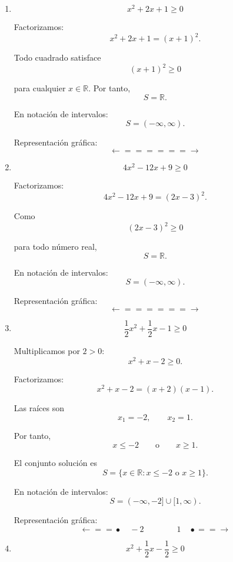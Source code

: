 \documentclass[12pt]{article}
\theoremstyle{plain}
\theoremstyle{definition}
\theoremstyle{remark}
\begin{document}
{\begin{enumerate}
Representación gráfica:
\[
\longleftarrow\!\!=\!\!=\!\bullet
\quad1
\qquad\qquad
3\quad
\bullet\!\!=\!\!=\!\longrightarrow
\]

\item
\[
x^2+2x+1\geq0
\]

Factorizamos:
\[
x^2+2x+1=(x+1)^2.
\]

Todo cuadrado satisface
\[
(x+1)^2\geq0
\]

para cualquier \(x\in\mathbb{R}\). Por tanto,
\[
\boxed{
S=\mathbb{R}.
}
\]

En notación de intervalos:
\[
\boxed{
S=(-\infty,\infty).
}
\]

Representación gráfica:
\[
\longleftarrow\!\!=\!\!=\!\!=\!\!=\!\!=\!\!=\!\longrightarrow
\]

\item
\[
4x^2-12x+9\geq0
\]

Factorizamos:
\[
4x^2-12x+9=(2x-3)^2.
\]

Como
\[
(2x-3)^2\geq0
\]

para todo número real,
\[
\boxed{
S=\mathbb{R}.
}
\]

En notación de intervalos:
\[
\boxed{
S=(-\infty,\infty).
}
\]

Representación gráfica:
\[
\longleftarrow\!\!=\!\!=\!\!=\!\!=\!\!=\!\!=\!\longrightarrow
\]

\item
\[
\frac{1}{2}x^2+\frac{1}{2}x-1\geq0
\]

Multiplicamos por \(2>0\):
\[
x^2+x-2\geq0.
\]

Factorizamos:
\[
x^2+x-2=(x+2)(x-1).
\]

Las raíces son
\[
x_1=-2,
\qquad
x_2=1.
\]

Por tanto,
\[
x\leq-2
\qquad\text{o}\qquad
x\geq1.
\]

El conjunto solución es
\[
\boxed{
S=
\{x\in\mathbb{R}:x\leq-2\text{ o }x\geq1\}.
}
\]

En notación de intervalos:
\[
\boxed{
S=(-\infty,-2]\cup[1,\infty).
}
\]

Representación gráfica:
\[
\longleftarrow\!\!=\!\!=\!\bullet
\quad-2
\qquad\qquad
1\quad
\bullet\!\!=\!\!=\!\longrightarrow
\]

\item
\[
x^2+\frac{1}{2}x-\frac{1}{2}\geq0
\]


\end{enumerate}}
\end{document}
